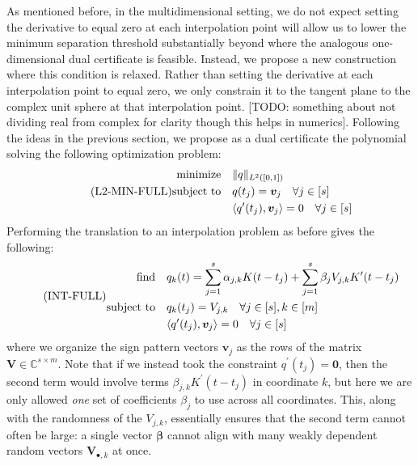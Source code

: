 \documentclass[11pt]{article}
\newcommand{\ra}{\rangle}
\newcommand{\la}{\langle}
\newcommand{\CC}{\mathbb{C}}
\newcommand{\HS}{\hspace{3.5mm}}
\newcommand{\bV}{\bm V}
\newcommand{\bv}{\bm v}
\begin{document}
As mentioned before, in the multidimensional setting, we do not expect setting the derivative to equal zero at each interpolation point will allow us to lower the minimum separation threshold substantially beyond where the analogous one-dimensional dual certificate is feasible.
Instead, we propose a new construction where this condition is relaxed.
Rather than setting the derivative at each interpolation point to equal zero, we only constrain it to the tangent plane to the complex unit sphere at that interpolation point.
[TODO: something about not dividing real from complex for clarity though this helps in numerics].
Following the ideas in the previous section, we propose as a dual certificate the polynomial solving the following optimization problem:
\begin{equation}
    \tag{L2-MIN-FULL}
    \begin{aligned}
  \text{minimize} &\HS \|q\|_{L^2([0, 1])} \\
  \text{subject to} &\HS q(t_j) = \bv_j \HS \forall j \in [s] \\
                  &\HS \la q^\prime(t_j), \bv_j \ra = 0 \HS \forall j \in [s]
              \end{aligned}
          \end{equation}
Performing the translation to an interpolation problem as before gives the following:
\begin{equation}
    \tag{INT-FULL}
    \begin{aligned}
  \text{find} &\HS q_k(t) = \sum_{j = 1}^s \alpha_{j, k} K(t - t_j) + \sum_{j = 1}^s \beta_jV_{j, k} K^\prime(t - t_j) \\
  \text{subject to} &\HS q_k(t_j) = V_{j, k} \HS \forall j \in [s], k \in [m] \\
  &\HS \la q^\prime(t_j), \bv_j \ra = 0 \HS \forall j \in [s]
\end{aligned}
\end{equation}
where we organize the sign pattern vectors $\bv_j$ as the rows of the matrix $\bV \in \CC^{s \times m}$.
Note that if we instead took the constraint $q^\prime(t_j) = \bm 0$, then the second term would involve terms $\beta_{j, k}K^\prime(t - t_j)$ in coordinate $k$, but here we are only allowed \emph{one} set of coefficients $\beta_j$ to use across all coordinates.
This, along with the randomness of the $V_{j, k}$, essentially ensures that the second term cannot often be large: a single vector $\bm \beta$ cannot align with many weakly dependent random vectors $\bV_{\bullet, k}$ at once.
\end{document}
